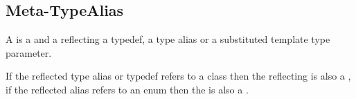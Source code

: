 \subsection{Meta-TypeAlias}
\label{concept-Meta-TypeAlias}

A  is a  and a 
reflecting a typedef, a type alias or a substituted template type parameter.



If the reflected type alias or typedef refers to a class then the reflecting
 is also a , if the reflected alias refers
to an enum then the  is also a .
